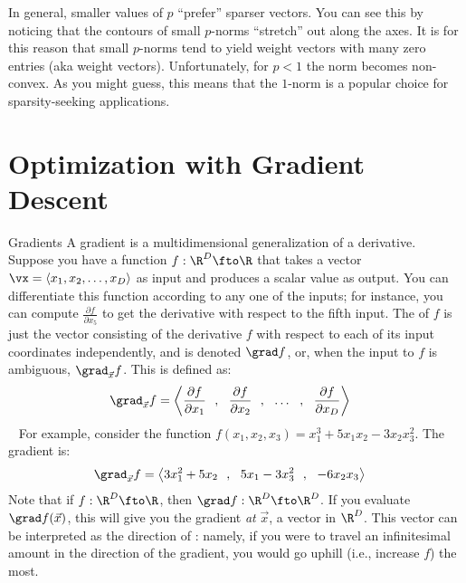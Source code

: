 
In general, smaller values of $p$ ``prefer'' sparser vectors.  You can
see this by noticing that the contours of small $p$-norms ``stretch''
out along the axes.  It is for this reason that small $p$-norms tend
to yield weight vectors with many zero entries (aka 
weight vectors).  Unfortunately, for $p<1$ the norm becomes
non-convex.  As you might guess, this means that the $1$-norm is a
popular choice for sparsity-seeking applications.

\section{Optimization with Gradient Descent}

\begin{mathreview}{Gradients}
  A gradient is a multidimensional generalization of a derivative.
  Suppose you have a function $f : \R^D \fto \R$ that takes a vector $\vx = \langle x_1, x_2, \dots, x_D \rangle$ as input and produces a scalar value as output.
  You can differentiate this function according to any one of the inputs; for instance, you can compute $\frac {\partial f} {\partial x_5}$ to get the derivative with respect to the fifth input.
  The  of $f$ is just the vector consisting of the derivative $f$ with respect to each of its input coordinates independently, and is denoted $\grad f$, or, when the input to $f$ is ambiguous, $\grad_{\vec x} f$.
  This is defined as:
  ~
  \begin{align}
    \grad_{\vec x} f &= \left\langle \frac {\partial f} {\partial x_1}~~,~~
                                    \frac {\partial f} {\partial x_2}~~,~~
                                    \dots~~,~~
                                    \frac {\partial f} {\partial x_D} \right\rangle
  \end{align}
  ~
  For example, consider the function $f(x_1, x_2, x_3) = x_1^3 + 5 x_1 x_2 - 3 x_2 x_3^2$.
  The gradient is:
  ~
  \begin{align}
    \grad_{\vec x} f &= \left\langle
                       3 x_1^2 + 5 x_2~~,~~
                       5 x_1 - 3 x_3^2~~,~~
                       -6 x_2 x_3 \right\rangle
  \end{align}
  Note that if $f : \R^D \fto \R$, then $\grad f : \R^D \fto \R^D$.
  If you evaluate $\grad f(\vec x)$, this will give you the gradient \emph{at} $\vec x$, a vector in $\R^D$.
  This vector can be interpreted as the direction of : namely, if you were to travel an infinitesimal amount in the direction of the gradient, you would go uphill (i.e., increase $f$) the most.
\end{mathreview}

